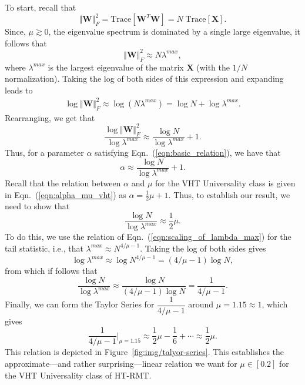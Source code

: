 {To start, recall that 
$$ 
\Vert \mathbf{W}\Vert_{F}^{2}=\mbox{Trace}[\mathbf{W}^{T}\mathbf{W}]=N\;\mbox{Trace}[\mathbf{X}]  .
$$
Since, $\mu \gtrsim 0$, 
the eigenvalue spectrum is dominated by a single large eigenvalue, it follows that
$$
\Vert \mathbf{W}\Vert_{F}^{2}\approx N\lambda^{max}  , 
$$
where $\lambda^{max}$ is the largest eigenvalue of the matrix $\mathbf{X}$ (with the $1/N$ normalization).
Taking the log of both sides of this expression and expanding leads to
\begin{eqnarray*}
\log\Vert \mathbf{W}\Vert_{F}^{2} 
   \approx \log \left( N\lambda^{max} \right) 
   =       \log N+\log\lambda^{max}  .
\end{eqnarray*}
Rearranging, we get that 
$$
\dfrac{\log\Vert \mathbf{W}\Vert_{F}^{2}}{\log\lambda^{max}}\approx \dfrac{\log N}{\log\lambda^{max}}+1  .
$$
Thus, for a parameter $\alpha$ satisfying Eqn.~(\ref{eqn:basic_relation}), we have that 
$$
\alpha\approx \dfrac{\log N}{\log\lambda^{max}}+1  .
$$
Recall that the relation between $\alpha$ and $\mu$ for the VHT Universality class is given in Eqn.~(\ref{eqn:alpha_mu_vht}) as
$ %
\alpha=\frac{1}{2}\mu+1  .
$ %
Thus, to establish our result, we need to show that
$$
\dfrac{\log N}{\log\lambda^{max}}\approx\dfrac{1}{2}\mu  .
$$
To do this, we use the relation of Eqn.~(\ref{eqn:scaling_of_lambda_max}) for the tail statistic, i.e., that 
$ %
\lambda^{max}\approx N^{4/\mu-1}  .
$ %
Taking the log of both sides gives
$$
\log\lambda^{max}\approx\log N^{4/\mu-1}=(4/\mu-1)\log N  ,
$$
from which if follows that
$$
\dfrac{\log N}{\log\lambda^{max}}\approx\dfrac{\log N}{(4/\mu-1)\log N}=\dfrac{1}{4/\mu-1}   .
$$
Finally, we can form the Taylor Series for $\dfrac{1}{4/\mu-1}$ around $\mu=1.15\approx 1$, which gives 
$$
\dfrac{1}{4/\mu-1}\bigg\rvert_{\mu=1.15}\approx\dfrac{1}{2}\mu-\dfrac{1}{6}+\cdots\approx\dfrac{1}{2}\mu  .
$$
This relation is depicted in Figure~\ref{fig:img/talyor-series}.
This establishes the approximate---and rather surprising---linear relation we want for $\mu\in[0.2]$ for
the VHT Universality class of HT-RMT.

}
